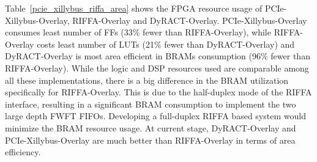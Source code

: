 

Table~\ref{pcie_xillybus_riffa_area} shows the FPGA resource usage of PCIe-Xillybus-Overlay, RIFFA-Overlay and DyRACT-Overlay. 
PCIe-Xillybus-Overlay consumes least number of FFs (33\% fewer than RIFFA-Overlay), while RIFFA-Overlay costs least number of LUTs (21\% fewer than DyRACT-Overlay) and DyRACT-Overlay is most area efficient in BRAMs consumption (96\% fewer than RIFFA-Overlay). 
While the logic and DSP resources used are comparable among all these implementations, there is a big difference in the BRAM utilization specifically for RIFFA-Overlay.
This is due to the half-duplex mode of the RIFFA interface, resulting in a significant BRAM consumption to implement the two large depth FWFT FIFOs. 
Developing a full-duplex RIFFA based system would minimize the BRAM resource usage. 
At current stage, DyRACT-Overlay and PCIe-Xillybus-Overlay are much better than RIFFA-Overlay in terms of area efficiency. 

\begin{table}[tb]
	\caption{Area overhead of PCIe-based systems.}
	\label{pcie_xillybus_riffa_area}
	\centering
\end{table}
